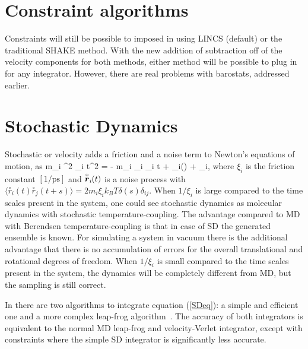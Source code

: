 \documentclass[11pt,a4paper,twoside]{article}
\begin{document}
\section{Constraint algorithms}

Constraints will still be possible to imposed in {\gromacs} using
LINCS (default) or the traditional SHAKE method.  With the new
addition of subtraction off of the velocity components for both
methods, either method will be possible to plug in for any integrator.
However, there are real problems with barostats, addressed earlier.


\newcommand{\vrond}{\stackrel{\circ}{\ve{r}}}
\newcommand{\rond}{\stackrel{\circ}{r}}
\newcommand{\ruis}{\ve{r}^G}

\section{Stochastic Dynamics}
\label{sec:SD}
Stochastic or velocity  adds a friction
and a noise term to Newton's equations of motion, as
\beq
\label{SDeq}
m_i {\de^2 _i \over \de t^2} =
- m_i \xi_i {\de {}_i \over \de t} + _i() + \vrond_i,
\eeq 
where $\xi_i$ is the friction constant $[1/\mbox{ps}]$ and
$\vrond_i\!\!(t)$  is a noise process with 
$\langle \rond_i\!\!(t) \rond_j\!\!(t+s) \rangle = 
    2 m_i \xi_i k_B T \delta(s) \delta_{ij}$.
When $1/\xi_i$ is large compared to the time scales present in the system,
one could see stochastic dynamics as molecular dynamics with stochastic
temperature-coupling. The advantage compared to MD with Berendsen
temperature-coupling is that in case of SD the generated ensemble is known.
For simulating a system in vacuum there is the additional advantage that there is no
accumulation of errors for the overall translational and rotational
degrees of freedom.
When $1/\xi_i$ is small compared to the time scales present in the system,
the dynamics will be completely different from MD, but the sampling is
still correct.

In {\gromacs} there are two algorithms to integrate equation
(\ref{SDeq}): a simple and efficient one and a more complex leap-frog
algorithm~\cite{Gunsteren88}.  The accuracy of both integrators is
equivalent to the normal MD leap-frog and velocity-Verlet integrator,
except with constraints where the simple SD integrator is
significantly less accurate.
\end{document}
